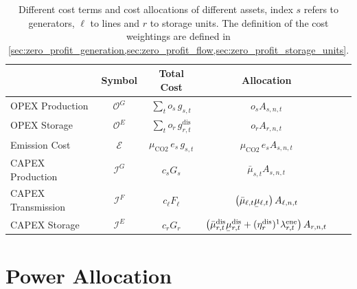 \documentclass[11pt,twocolumn]{article}
\newcommand{\ubar}[1]{\underaccent{\bar}{#1}}
\newcommand{\generation}{g_{s,t}}
\newcommand{\capacitygeneration}{G_{s}}
\newcommand{\operationalpricegeneration}{o_{s}}
\newcommand{\capitalpricegeneration}{c_{s}}
\newcommand{\muuppergeneration}{\bar{\mu}_{s,t}}
\newcommand{\capacityflow}{F_{\ell}}
\newcommand{\capitalpriceflow}{c_{\ell}}
\newcommand{\mulowerflow}{\ubar{\mu}_{\ell,t}}
\newcommand{\muupperflow}{\bar{\mu}_{\ell,t}}
\newcommand{\storage}{g_{r,t}}
\newcommand{\storagedispatch}{\storage^\text{dis}}
\newcommand{\efficiency}{\eta_{r}}
\newcommand{\efficiencydispatch}{\efficiency^\text{dis}}
\newcommand{\operationalpricestorage}{o_r}
\newcommand{\capitalpricestorage}{c_r}
\newcommand{\capacitystorage}{G_r}
\newcommand{\mulowerstoragedispatch}{\ubar{\mu}_{r,t}^\text{dis}}
\newcommand{\muupperstoragedispatch}{\bar{\mu}_{r,t}^\text{dis}}
\newcommand{\mustateofcharge}{\lambda^\text{ene}_{r,t}}
\newcommand{\emission}{e_{s}}
\newcommand{\emissionprice}{\mu_{\text{CO2}}}
\newcommand{\opexgeneration}{\mathcal{O}^G}
\newcommand{\opexstorage}{\mathcal{O}^E}
\newcommand{\capexgeneration}{\mathcal{I}^G}
\newcommand{\capexflow}{\mathcal{I}^F}
\newcommand{\capexstorage}{\mathcal{I}^E}
\newcommand{\emissioncost}{\mathcal{E}}
\newcommand{\allocategeneration}[1][s, n]{A_{#1,t}}
\newcommand{\allocatestoragedispatch}[1][r, n]{A_{#1,t}}
\newcommand{\allocateflow}[1][n]{A_{\ell,#1,t}}
\begin{document}
\begin{table}[t]
        \begin{center}
            \begin{tabular}{l|c|c|c|c|c}
            &  Symbol  & Total Cost & Allocation   \\
            \toprule 
            OPEX Production & $\opexgeneration$ & $\sum_{t} \operationalpricegeneration \, \generation$   & $\operationalpricegeneration \allocategeneration $ \\  
            OPEX Storage & $\opexstorage$ & $\sum_{t} \operationalpricestorage \, \storagedispatch$ &  $\operationalpricestorage \allocatestoragedispatch $ \\
            \midrule
            Emission Cost & $\emissioncost$ & $ \emissionprice \, \emission \, \generation$ & $\emissionprice \,\emission \allocategeneration$ \\
            \midrule   
            CAPEX Production & $\capexgeneration$ & $ \capitalpricegeneration \capacitygeneration$ & $\muuppergeneration \allocategeneration$ \\
            CAPEX Transmission & $\capexflow$ & $ \capitalpriceflow \capacityflow$ & $\left(\muupperflow  \mulowerflow \right) \allocateflow$ \\
            CAPEX Storage & $\capexstorage$ & $ \capitalpricestorage \capacitystorage$ & $ \left(\muupperstoragedispatch  \mulowerstoragedispatch  + (\efficiencydispatch )^{1} \mustateofcharge\right) \allocatestoragedispatch$ \\
        \end{tabular}
        \end{center}
        \caption{Different cost terms and cost allocations of different assets, index $s$ refers to generators, $\ell$ to lines and $r$ to storage units. The definition of the cost weightings are defined in \cref{sec:zero_profit_generation,sec:zero_profit_flow,sec:zero_profit_storage_units}.}
        \label{tab:cost_allocation_map}
\end{table}
    
    

\section{Power Allocation}
\label{sec:net_ap}

\newcommand{\incidenceM}{K}
\newcommand{\flowM}{f}
\newcommand{\injectionM}{p}
\newcommand{\slackM}{k}
\newcommand{\DirectedIncidence}{\mathcal{K}}
\newcommand{\InverseAPInjection}{\mathcal{J}}
\newcommand\diag[1]{\operatorname{diag}\left(#1\right)}
\end{document}

